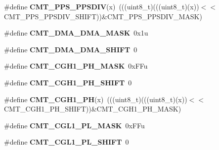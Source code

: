 \begin{DoxyCompactItemize}
\item 
\#define {\bfseries C\+M\+T\+\_\+\+P\+P\+S\+\_\+\+P\+P\+S\+D\+IV}(x)~(((uint8\+\_\+t)(((uint8\+\_\+t)(x))$<$$<$C\+M\+T\+\_\+\+P\+P\+S\+\_\+\+P\+P\+S\+D\+I\+V\+\_\+\+S\+H\+I\+FT))\&C\+M\+T\+\_\+\+P\+P\+S\+\_\+\+P\+P\+S\+D\+I\+V\+\_\+\+M\+A\+SK)\hypertarget{group__CMT__Register__Masks_ga47d0c8720fa9b402dbacf8e53eec5134}{}\label{group__CMT__Register__Masks_ga47d0c8720fa9b402dbacf8e53eec5134}

\item 
\#define {\bfseries C\+M\+T\+\_\+\+D\+M\+A\+\_\+\+D\+M\+A\+\_\+\+M\+A\+SK}~0x1u\hypertarget{group__CMT__Register__Masks_ga65c04dcbc5d319c8f0532568570e555a}{}\label{group__CMT__Register__Masks_ga65c04dcbc5d319c8f0532568570e555a}

\item 
\#define {\bfseries C\+M\+T\+\_\+\+D\+M\+A\+\_\+\+D\+M\+A\+\_\+\+S\+H\+I\+FT}~0\hypertarget{group__CMT__Register__Masks_gaf60148184935a9ae825cecc482734b31}{}\label{group__CMT__Register__Masks_gaf60148184935a9ae825cecc482734b31}

\item 
\#define {\bfseries C\+M\+T\+\_\+\+C\+G\+H1\+\_\+\+P\+H\+\_\+\+M\+A\+SK}~0x\+F\+Fu\hypertarget{group__CMT__Register__Masks_ga4ca405c6721e302fabcb4ddcc7773f1a}{}\label{group__CMT__Register__Masks_ga4ca405c6721e302fabcb4ddcc7773f1a}

\item 
\#define {\bfseries C\+M\+T\+\_\+\+C\+G\+H1\+\_\+\+P\+H\+\_\+\+S\+H\+I\+FT}~0\hypertarget{group__CMT__Register__Masks_ga6021b3f0f356c06b50371a28bf83f27e}{}\label{group__CMT__Register__Masks_ga6021b3f0f356c06b50371a28bf83f27e}

\item 
\#define {\bfseries C\+M\+T\+\_\+\+C\+G\+H1\+\_\+\+PH}(x)~(((uint8\+\_\+t)(((uint8\+\_\+t)(x))$<$$<$C\+M\+T\+\_\+\+C\+G\+H1\+\_\+\+P\+H\+\_\+\+S\+H\+I\+FT))\&C\+M\+T\+\_\+\+C\+G\+H1\+\_\+\+P\+H\+\_\+\+M\+A\+SK)\hypertarget{group__CMT__Register__Masks_gaab6db22ced1eff50005d7df4d1d6dc0f}{}\label{group__CMT__Register__Masks_gaab6db22ced1eff50005d7df4d1d6dc0f}

\item 
\#define {\bfseries C\+M\+T\+\_\+\+C\+G\+L1\+\_\+\+P\+L\+\_\+\+M\+A\+SK}~0x\+F\+Fu\hypertarget{group__CMT__Register__Masks_gab1d6a610e9cc0a024160f157f48a851f}{}\label{group__CMT__Register__Masks_gab1d6a610e9cc0a024160f157f48a851f}

\item 
\#define {\bfseries C\+M\+T\+\_\+\+C\+G\+L1\+\_\+\+P\+L\+\_\+\+S\+H\+I\+FT}~0\hypertarget{group__CMT__Register__Masks_gaa7bf093c1ef1bfd7e40a2740eafb093d}{}\label{group__CMT__Register__Masks_gaa7bf093c1ef1bfd7e40a2740eafb093d}


\end{DoxyCompactItemize}
